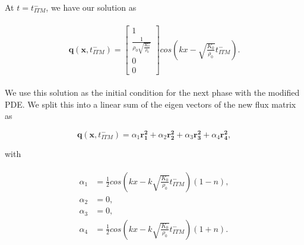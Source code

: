 At $t = t_{ITM}^-$, we have our solution as 

\begin{align}
    \begin{split}
        \mathbf{q}\left(\mathbf{x}, t_{ITM}^-\right) = \begin{bmatrix}
            1 \\
            \frac{1}{\rho_{0} \sqrt{\frac{K_{0}}{\rho_{0}}}} \\
            0 \\
            0
            \end{bmatrix} cos\left(kx - \sqrt{\frac{K_{0}}{\rho_{0}}}t_{ITM}^-\right) .
    \end{split}
\end{align}

We use this solution as the initial condition for the next phase with the modified PDE. We split this into a linear sum of the eigen vectors of the new flux matrix
as 

\begin{equation}
    \mathbf{q}\left(\mathbf{x}, t_{ITM}^-\right) = \alpha_1 \mathbf{r_1^2} + \alpha_2 \mathbf{r_2^2} + \alpha_3 \mathbf{r_3^2} + \alpha_4 \mathbf{r_4^2},
\end{equation}

with 

\begin{align}
    \begin{split}
        \alpha_1 &= \frac{1}{2}cos\left(kx - k \sqrt{\frac{K_0}{\rho_0}} t_{ITM}^-\right) \left(1 - n\right), \\
        \alpha_2 &= 0, \\
        \alpha_3 &= 0, \\
        \alpha_4 &= \frac{1}{2}cos\left(kx - k \sqrt{\frac{K_0}{\rho_0}} t_{ITM}^-\right) \left(1 + n\right) .
    \end{split}
\end{align}

